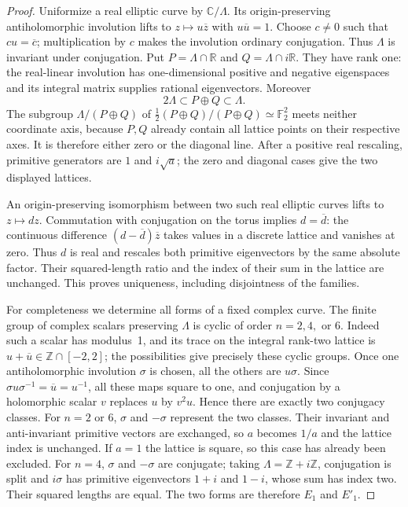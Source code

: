 \begin{proof}
Uniformize a real elliptic curve by $\mathbb C/\Lambda$. Its
origin-preserving antiholomorphic involution lifts to
$z\mapsto u\overline z$ with $u\overline u=1$. Choose $c\ne0$ such
that $cu=\overline c$; multiplication by $c$ makes the involution
ordinary conjugation. Thus $\Lambda$ is invariant under conjugation.
Put $P=\Lambda\cap\mathbb R$ and $Q=\Lambda\cap i\mathbb R$.
They have rank one: the real-linear involution has one-dimensional
positive and negative eigenspaces and its integral matrix supplies
rational eigenvectors. Moreover
\[
 2\Lambda\subset P\oplus Q\subset\Lambda.
\]
The subgroup $\Lambda/(P\oplus Q)$ of
$\tfrac12(P\oplus Q)/(P\oplus Q)\simeq\mathbb F_2^2$ meets neither
coordinate axis, because $P,Q$ already contain all lattice points on
their respective axes. It is therefore either zero or the diagonal
line. After a positive real rescaling, primitive generators are
$1$ and $i\sqrt a$; the zero and diagonal cases give the two
displayed lattices.

An origin-preserving isomorphism between two such real elliptic
curves lifts to $z\mapsto dz$. Commutation with conjugation on the
torus implies $d=\overline d$: the continuous difference
$(d-\overline d)\overline z$ takes values in a discrete lattice and
vanishes at zero. Thus $d$ is real and rescales both primitive
eigenvectors by the same absolute factor. Their squared-length
ratio and the index of their sum in the lattice are unchanged.
This proves uniqueness, including disjointness of the families.

For completeness we determine all forms of a fixed complex curve.
The finite group of complex scalars preserving $\Lambda$ is cyclic
of order $n=2,4,$ or $6$. Indeed such a scalar has modulus~1,
and its trace on the integral rank-two lattice is
$u+\overline u\in\mathbb Z\cap[-2,2]$; the possibilities give
precisely these cyclic groups. Once one antiholomorphic involution
$\sigma$ is chosen, all the others are $u\sigma$. Since
$\sigma u\sigma^{-1}=\overline u=u^{-1}$, all these maps square to
one, and conjugation by a holomorphic scalar $v$ replaces $u$ by
$v^2u$. Hence there are exactly two conjugacy classes.
For $n=2$ or $6$, $\sigma$ and $-\sigma$ represent the two classes.
Their invariant and anti-invariant primitive vectors are exchanged,
so $a$ becomes $1/a$ and the lattice index is unchanged. If $a=1$
the lattice is square, so this case has already been excluded.
For $n=4$, $\sigma$ and $-\sigma$ are conjugate; taking
$\Lambda=\mathbb Z+i\mathbb Z$, conjugation is split and
$i\sigma$ has primitive eigenvectors $1+i$ and $1-i$, whose sum
has index two. Their squared lengths are equal. The two forms are
therefore $E_1$ and $E'_1$.


\end{proof}
